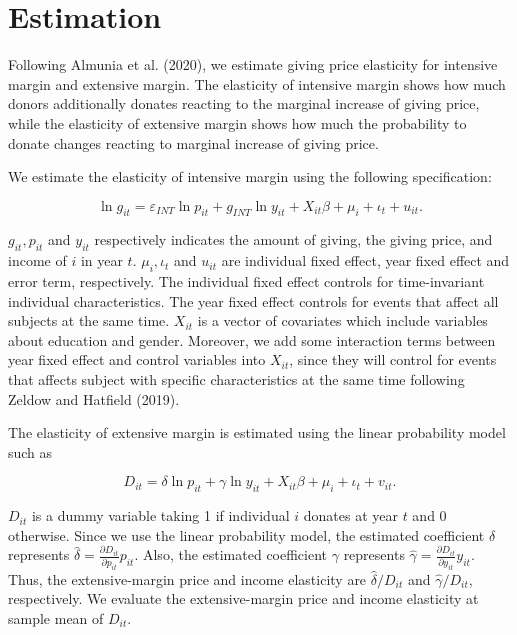 \documentclass[ review  , 3p ]{elsarticle}
\begin{document}
  \hypertarget{estimation}{%
  \section{Estimation}\label{estimation}}

  Following Almunia et al. (2020), we estimate giving price elasticity for intensive margin and extensive margin. The elasticity of intensive margin shows how much donors additionally donates reacting to the marginal increase of giving price, while the elasticity of extensive margin shows how much the probability to donate changes reacting to marginal increase of giving price.

  We estimate the elasticity of intensive margin using the following specification:

  \begin{equation}
      \ln g_{it} = \varepsilon_{INT} \ln p_{it} +g_{INT} \ln y_{it} + X_{it}\beta +\mu_i +\iota_t +u_{it}. \label{eq:intensive}
  \end{equation}

  \(g_{it}, p_{it}\) and \(y_{it}\) respectively indicates the amount of giving, the giving price, and income of \(i\) in year \(t\). \(\mu_i, \iota_t\) and \(u_{it}\) are individual fixed effect, year fixed effect and error term, respectively.
  The individual fixed effect controls for time-invariant individual characteristics. The year fixed effect controls for events that affect all subjects at the same time. \(X_{it}\) is a vector of covariates which include variables about education and gender. Moreover, we add some interaction terms between year fixed effect and control variables into \(X_{it}\), since they will control for events that affects subject with specific characteristics at the same time following Zeldow and Hatfield (2019).

  The elasticity of extensive margin is estimated using the linear probability model such as

  \begin{equation}
  D_{it} =  \delta \ln p_{it} +\gamma \ln y_{it} + X_{it}\beta+\mu_i  +\iota_t +v_{it}. \label{eq:extensive}
  \end{equation}

  \(D_{it}\) is a dummy variable taking 1 if individual \(i\) donates at year \(t\) and 0 otherwise.
  Since we use the linear probability model,
  the estimated coefficient \(\delta\) represents \(\hat{\delta} = \frac{\partial D_{it}}{\partial p_{it}} p_{it}\).
  Also, the estimated coefficient \(\gamma\) represents \(\hat{\gamma} = \frac{\partial D_{it}}{\partial y_{it}} y_{it}\).
  Thus, the extensive-margin price and income elasticity are \(\hat{\delta}/D_{it}\) and \(\hat{\gamma}/D_{it}\), respectively.
  We evaluate the extensive-margin price and income elasticity at sample mean of \(D_{it}\).
\end{document}
